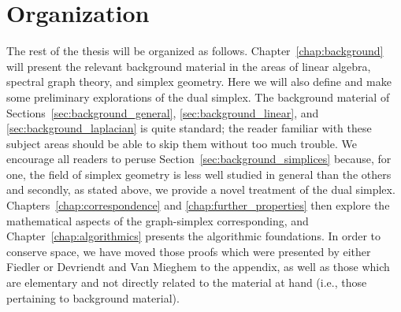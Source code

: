 \section{Organization}
\label{sec:intro_organization}

The rest of the thesis will be  organized as follows. Chapter~\ref{chap:background} will present the relevant background material in the areas of linear algebra, spectral graph theory, and simplex  geometry. Here we will also define and make some preliminary explorations of the dual simplex. The  background material  of Sections~\ref{sec:background_general}, \ref{sec:background_linear},  and \ref{sec:background_laplacian} is quite standard; the reader familiar with  these subject areas should  be able to skip  them without too much trouble. We  encourage all readers to peruse Section~\ref{sec:background_simplices} because, for one, the field  of simplex geometry is  less  well  studied  in general than the others and secondly, as stated above, we provide a novel treatment of  the dual simplex. Chapters~\ref{chap:correspondence} and \ref{chap:further_properties} then explore the mathematical aspects  of  the graph-simplex corresponding, and Chapter~\ref{chap:algorithmics} presents the algorithmic foundations. In order  to conserve  space, we have moved those proofs which were   presented by either Fiedler or Devriendt and Van Mieghem to the appendix, as well as those which are elementary and not directly related to the material at  hand (i.e., those pertaining  to background material). 









     

  	
